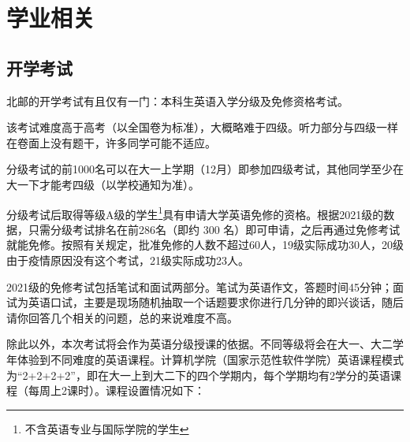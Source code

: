 \section{学业相关}

\subsection{开学考试}

北邮的开学考试有且仅有一门：本科生英语入学分级及免修资格考试。

该考试难度高于高考（以全国卷为标准），大概略难于四级。听力部分与四级一样在卷面上没有题干，许多同学可能不适应。

分级考试的前1000名可以在大一上学期（12月）即参加四级考试，其他同学至少在大一下才能考四级（以学校通知为准）。

分级考试后取得等级A级的学生\footnote{不含英语专业与国际学院的学生}具有申请大学英语免修的资格。根据2021级的数据，只需分级考试排名在前286名（即约 300 名）即可申请，之后再通过免修考试就能免修。按照有关规定，批准免修的人数不超过60人，19级实际成功30人，20级由于疫情原因没有这个考试，21级实际成功23人。

2021级的免修考试包括笔试和面试两部分。笔试为英语作文，答题时间45分钟；面试为英语口试，主要是现场随机抽取一个话题要求你进行几分钟的即兴谈话，随后请你回答几个相关的问题，总的来说难度不高。

除此以外，本次考试将会作为英语分级授课的依据。不同等级将会在大一、大二学年体验到不同难度的英语课程。计算机学院（国家示范性软件学院）英语课程模式为“2+2+2+2”，即在大一上到大二下的四个学期内，每个学期均有2学分的英语课程（每周上2课时）。课程设置情况如下：

